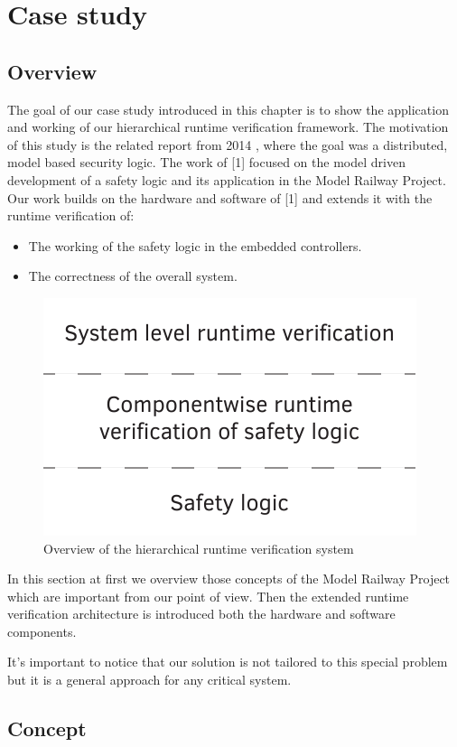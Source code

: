 \chapter{Case study}
\label{chap:case_study}

\section{Overview}

The goal of our case study introduced in this chapter is to show the application and working of our hierarchical runtime verification framework. The motivation of this study is the related report from 2014 \citep{tdk2014}, where the goal was a distributed, model based security logic. The work of [1] focused on the model driven development of a safety logic and its application in the Model Railway Project. Our work builds on the hardware and software of [1] and extends it with the runtime verification of:
\begin{itemize}
	\item The working of the safety logic in the embedded controllers.
	\item The correctness of the overall system.
\end{itemize}

\begin{figure}[h]
	\centering
	\includegraphics[width=0.5\linewidth]{include/figures/chapter_6/overview_1}
	\caption{Overview of the hierarchical runtime verification system}
	\label{fig:case_study:fov}
\end{figure}

In this section at first we overview those concepts of the Model Railway Project which are important from our point of view. Then the extended runtime verification architecture is introduced both the hardware and software components.

It's important to notice that our solution is not tailored to this special problem but it is a general approach for any critical system.

\section{Concept}

